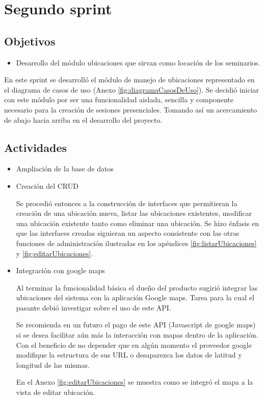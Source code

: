 \section{Segundo sprint} %
\label{sec:segundo_sprint}

\subsection{Objetivos}

\begin{itemize}
	\item Desarrollo del módulo ubicaciones que sirvan como locación de los seminarios.
\end{itemize}

En este sprint se desarrolló el módulo de manejo de ubicaciones representado en el diagrama de casos de uso (Anexo \ref{fig:diagramaCasosDeUso}). Se decidió iniciar con este módulo por ser una funcionalidad aislada, sencilla y componente necesario para la creación de sesiones presenciales. Tomando así un acercamiento de abajo hacia arriba en el desarrollo del proyecto.

\subsection{Actividades} %
\label{sub:actividades2}

\begin{itemize}

\item Ampliación de la base de datos

\item Creación del \gls{CRUD}


Se procedió entonces a la construcción de interfaces que permitieran la creación de una ubicación nueva, listar las ubicaciones existentes, modificar una ubicación existente tanto como eliminar una ubicación. Se hizo énfasis en que las interfaces creadas siguieran un aspecto consistente con las otras funciones de administración ilustradas en los apéndices \ref{fig:listarUbicaciones} y \ref{fig:editarUbicaciones}.

\item Integración con google maps

Al terminar la funcionalidad básica el dueño del producto sugirió integrar las ubicaciones del sistema con la aplicación Google maps. Tarea para la cual el pasante debió investigar sobre el uso de este \gls{API}. 

Se recomienda en un futuro el pago de este \gls{API} (Javascript de google maps) si se desea facilitar aún más la interacción con mapas dentro de la aplicación. Con el beneficio de no depender que en algún momento el proveedor google modifique la estructura de sus \gls{URL} o desaparezca los datos de latitud y longitud de las mismas.

En el Anexo \ref{fig:editarUbicaciones} se muestra como se integró el mapa a la vista de editar ubicación.

\end{itemize}





